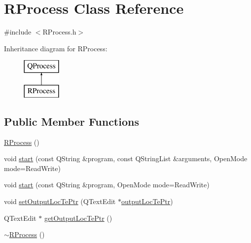 \hypertarget{class_r_process}{\section{R\-Process Class Reference}
\label{class_r_process}
}


{\ttfamily \#include $<$R\-Process.\-h$>$}

Inheritance diagram for R\-Process\-:\begin{figure}[H]
\begin{center}
\leavevmode
\includegraphics[height=2.000000cm]{class_r_process}
\end{center}
\end{figure}
\subsection*{Public Member Functions}
\begin{DoxyCompactItemize}
\item 
\hyperlink{class_r_process_a0feed4537b0182e71e7a6e1487469b46}{R\-Process} ()
\item 
void \hyperlink{class_r_process_aa67a04b5cac4be62c7e92dc1a74c9bc9}{start} (const Q\-String \&program, const Q\-String\-List \&arguments, Open\-Mode mode=Read\-Write)
\item 
void \hyperlink{class_r_process_a31b1e333a100dcbb9c38d002e0a1a7d5}{start} (const Q\-String \&program, Open\-Mode mode=Read\-Write)
\item 
void \hyperlink{class_r_process_a5a51099bf886ea10d8b66f70cc73ac49}{set\-Output\-Loc\-Te\-Ptr} (Q\-Text\-Edit $\ast$\hyperlink{class_r_process_aed80aa706e075172bea530beef40f62b}{output\-Loc\-Te\-Ptr})
\item 
Q\-Text\-Edit $\ast$ \hyperlink{class_r_process_ad218619a1ef9a225eca8dd1174a4ad80}{get\-Output\-Loc\-Te\-Ptr} ()
\item 
\hyperlink{class_r_process_a23f0b14a43c115392eb867229af5cfdc}{$\sim$\-R\-Process} ()
\end{DoxyCompactItemize}
